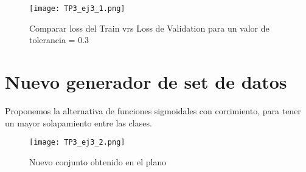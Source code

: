 \documentclass{article}
\begin{document}
\begin{figure}[ht]
    \centering
    \texttt{[image: TP3\_ej3\_1.png]}
    \caption{Comparar loss del Train vrs Loss de Validation para un valor de tolerancia = 0.3}
    \label{fig:TP3_ej3_1}
\end{figure}

\section{Nuevo generador de set de datos}
Proponemos la alternativa de funciones sigmoidales con corrimiento, para tener un mayor solapamiento entre las clases.

\begin{figure}[ht]
    \centering
    \texttt{[image: TP3\_ej3\_2.png]}
    \caption{Nuevo conjunto obtenido en el plano}
    \label{fig:TP3_ej3_2}
\end{figure}
\end{document}
